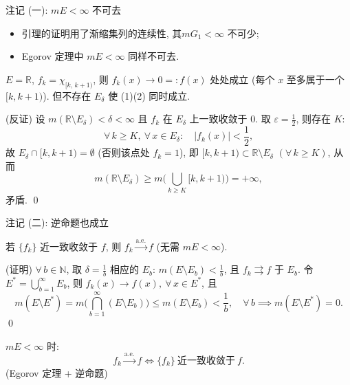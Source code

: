 \begin{frame}{注记 (一): $mE < \infty$ 不可去}

\begin{itemize}
\item 引理的证明用了渐缩集列的连续性, 其\alert{$mG_1 < \infty$ 不可少};
\item Egorov 定理中 \alert{$mE < \infty$ 同样不可去}.
\end{itemize}

\begin{eg}
$E = \mathbb{R}$, $f_k = \chi_{[k,\, k+1)}$, 则 $f_k(x) \to 0 =: f(x)$ 处处成立 (每个 $x$ 至多属于一个 $[k, k+1)$). 但不存在 $E_\delta$ 使 (1)(2) 同时成立.
\end{eg}

\pause

\startproof[bg=yellow, fg=red](反证)
设 $m(\mathbb{R} \setminus E_\delta) < \delta < \infty$ 且 $f_k$ 在 $E_\delta$ 上一致收敛于 $0$. 取 $\varepsilon = \frac12$, 则存在 $K$:
\[
\forall\, k \geqslant K,\ \forall\, x \in E_\delta:\quad |f_k(x)| < \frac12,
\]
故 $E_\delta \cap [k, k+1) = \emptyset$ (否则该点处 $f_k = 1$), 即 $[k, k+1) \subset \mathbb{R} \setminus E_\delta$ $(\forall\, k \geqslant K)$, 从而
\[
m(\mathbb{R} \setminus E_\delta) \geqslant m\Big(\bigcup_{k \geqslant K} [k, k+1)\Big) = +\infty,
\]
矛盾.
\qed

\end{frame}


\begin{frame}{注记 (二): 逆命题也成立}

\begin{prop}
若 $\{f_k\}$ 近一致收敛于 $f$, 则 $f_k \xrightarrow{\text{a.e.}} f$ (\alert{无需} $mE < \infty$).
\end{prop}

\startproof[bg=yellow, fg=red](证明)
$\forall\, b \in \mathbb{N}$, 取 $\delta = \frac1b$ 相应的 $E_b$: $m(E \setminus E_b) < \frac1b$, 且 $f_k \rightrightarrows f$ 于 $E_b$. 令 $E^* = \bigcup_{b=1}^{\infty} E_b$, 则 $f_k(x) \to f(x),\ \forall\, x \in E^*$, 且
\[
m(E \setminus E^*) = m\Big(\bigcap_{b=1}^{\infty} (E \setminus E_b)\Big)
\leqslant m(E \setminus E_b) < \frac1b, \quad \forall\, b
\implies m(E \setminus E^*) = 0 .
\]
\qed

\pause

\begin{cor}
$mE < \infty$ 时:
\[
f_k \xrightarrow{\text{a.e.}} f
\iff
\{f_k\}\ \text{近一致收敛于}\ f .
\]
(Egorov 定理 + 逆命题)
\end{cor}

\end{frame}

